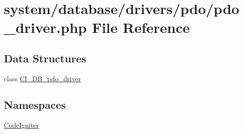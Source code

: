 \hypertarget{pdo__driver_8php}{\section{system/database/drivers/pdo/pdo\-\_\-driver.php File Reference}
\label{pdo__driver_8php}
}
\subsection*{Data Structures}
\begin{DoxyCompactItemize}
\item 
class \hyperlink{class_c_i___d_b__pdo__driver}{C\-I\-\_\-\-D\-B\-\_\-pdo\-\_\-driver}
\end{DoxyCompactItemize}
\subsection*{Namespaces}
\begin{DoxyCompactItemize}
\item 
\hyperlink{namespace_code_igniter}{Code\-Igniter}
\end{DoxyCompactItemize}
